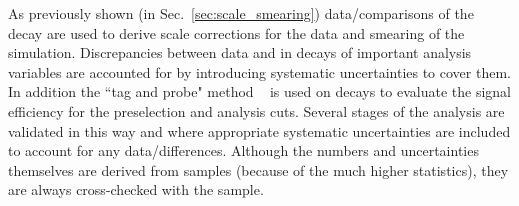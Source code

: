As previously shown (in Sec.~\ref{sec:scale_smearing}) data/\MC comparisons of the \Zee decay are used to derive scale corrections for the data and smearing of the \MC simulation. Discrepancies between data and \MC in \Zee decays of important analysis variables are accounted for by introducing systematic uncertainties to cover them. In addition the ``tag and probe" method ~\cite{tag_and_probe} is used on \Zee decays to evaluate the signal efficiency for the preselection and analysis cuts. Several stages of the analysis are validated in this way and where appropriate systematic uncertainties are included to account for any data/\MC differences. Although the numbers and uncertainties themselves are derived from \Zee samples (because of the much higher statistics), they are always cross-checked with the \Zmumugamma sample.

